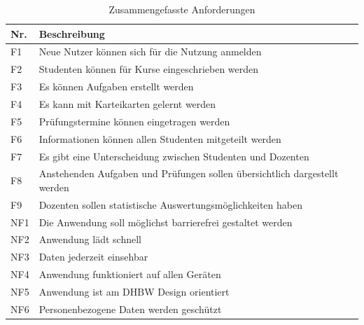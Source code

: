\begin{table}[h]
    \centering
    \begin{tabularx}{.8\textwidth}{l|X}
        Nr.     & Beschreibung                              \\\hline
        F1      & Neue Nutzer können sich für die Nutzung anmelden                    \\
        F2      & Studenten können für Kurse eingeschrieben werden  \\
        F3      & Es können Aufgaben erstellt werden   \\
        F4      & Es kann mit Karteikarten gelernt werden  \\
        F5      & Prüfungstermine können eingetragen werden  \\
        F6      & Informationen können allen Studenten mitgeteilt werden  \\
        F7      & Es gibt eine Unterscheidung zwischen Studenten und Dozenten  \\
        F8      & Anstehenden Aufgaben und Prüfungen sollen übersichtlich dargestellt werden  \\
        F9      & Dozenten sollen statistische Auswertungsmöglichkeiten haben\\\hline
        NF1     & Die Anwendung soll möglichst barrierefrei gestaltet werden\\
        NF2     & Anwendung lädt schnell                    \\
        NF3     & Daten jederzeit einsehbar                 \\
        NF4     & Anwendung funktioniert auf allen Geräten  \\
        NF5     & Anwendung ist am DHBW Design orientiert   \\
        NF6     & Personenbezogene Daten werden geschützt  \\
    \end{tabularx}
    \caption{Zusammengefasste Anforderungen}
    \label{tab:anforderungen}
\end{table}



